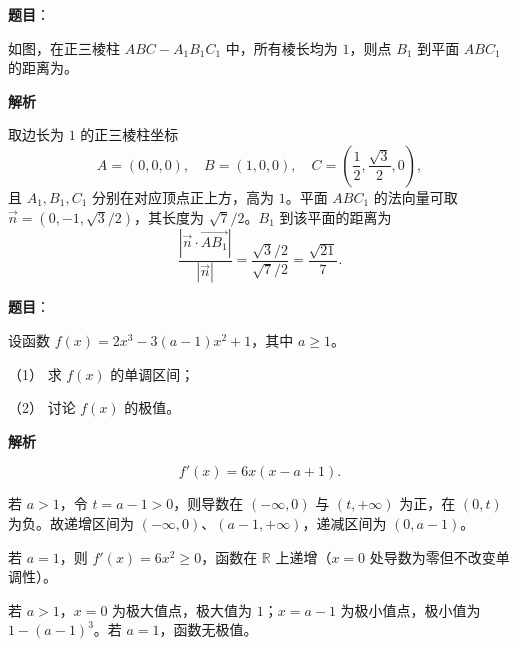 \begin{answer}

\textbf{题目}：

如图，在正三棱柱 $ABC-A_1B_1C_1$ 中，所有棱长均为 $1$，则点 $B_1$ 到平面 $ABC_1$ 的距离为\gkblank{}。
\nopagebreak[4]
\begin{center}\end{center}
\nopagebreak[4]
\textbf{解析}

取边长为 $1$ 的正三棱柱坐标
\nopagebreak[4]
\[
A=(0,0,0),\quad B=(1,0,0),\quad C=\left(\frac12,\frac{\sqrt3}{2},0\right),
\]
且 $A_1,B_1,C_1$ 分别在对应顶点正上方，高为 $1$。平面 $ABC_1$ 的法向量可取 $\vec n=(0,-1,\sqrt3/2)$，其长度为 $\sqrt7/2$。$B_1$ 到该平面的距离为
\nopagebreak[4]
\[
\frac{|\vec n\cdot\overrightarrow{AB_1}|}{|\vec n|}=\frac{\sqrt3/2}{\sqrt7/2}=\frac{\sqrt{21}}7.
\]


\end{answer}
\begin{answer}

\textbf{题目}：

设函数 $f(x)=2x^3-3(a-1)x^2+1$，其中 $a\ge 1$。

（1） 求 $f(x)$ 的单调区间；

（2） 讨论 $f(x)$ 的极值。

\textbf{解析}

\nopagebreak[4]
\[
f'(x)=6x(x-a+1).
\]


若 $a>1$，令 $t=a-1>0$，则导数在 $(-\infty,0)$ 与 $(t,+\infty)$ 为正，在 $(0,t)$ 为负。故递增区间为 $(-\infty,0)$、$(a-1,+\infty)$，递减区间为 $(0,a-1)$。

若 $a=1$，则 $f'(x)=6x^2\ge0$，函数在 $\mathbb R$ 上递增（$x=0$ 处导数为零但不改变单调性）。


若 $a>1$，$x=0$ 为极大值点，极大值为 $1$；$x=a-1$ 为极小值点，极小值为 $1-(a-1)^3$。若 $a=1$，函数无极值。



\end{answer}
